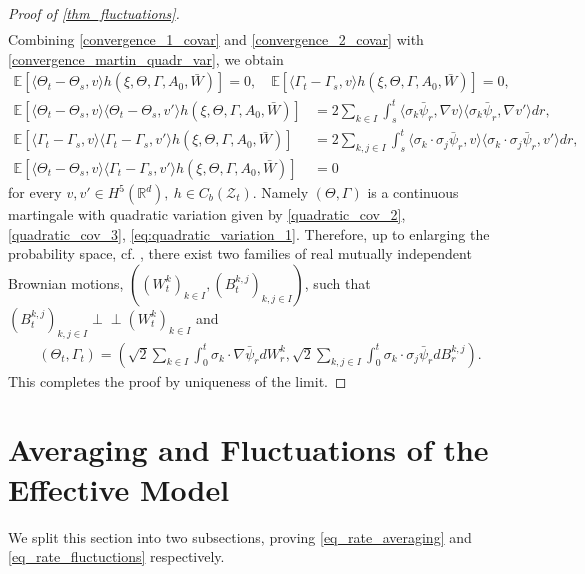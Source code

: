\documentclass[a4paper,10pt]{amsart}
\newcommand{\R}{\mathbb{R}}
\theoremstyle{remark}
\numberwithin{equation}{section}
\begin{document}
\begin{proof}[Proof of \cref{thm_fluctuations}]
\begin{multline}
\end{multline}
Combining \eqref{convergence_1_covar} and \eqref{convergence_2_covar} with \eqref{convergence_martin_quadr_var}, we obtain
\begin{align*}
\mathbb{E}\left[\langle \Theta_t-\Theta_s,v\rangle h(\xi,\Theta,\Gamma, A_0,\bar{W})\right]=0,\quad \mathbb{E}\left[\langle \Gamma_t-\Gamma_s,v\rangle h(\xi,\Theta,\Gamma, A_0,\bar{W})\right]=0,
    \end{align*}
    \begin{align}
    \label{quadratic_cov_2}
\mathbb{E}\left[\langle \Theta_t-\Theta_s,v\rangle\langle \Theta_t-\Theta_s,v'\rangle h(\xi,\Theta,\Gamma, A_0,\bar{W})\right]  &=2\sum_{k\in I}\int_s^t \langle \sigma_k\bar{\psi}_r,\nabla v\rangle \langle \sigma_k\bar{\psi}_{r},\nabla v'\rangle dr,\\ \label{quadratic_cov_3}
\mathbb{E}\left[\langle \Gamma_t-\Gamma_s,v\rangle\langle \Gamma_t-\Gamma_s,v'\rangle h(\xi,\Theta,\Gamma, A_0,\bar{W})\right]  &=2\sum_{k,j\in I}\int_s^t \langle \sigma_k\cdot\sigma_j\bar{\psi}_r, v\rangle \langle \sigma_k\cdot\sigma_j\bar{\psi}_{r}, v'\rangle dr,\\ \mathbb{E}\left[\langle \Theta_t-\Theta_s,v\rangle\langle \Gamma_t-\Gamma_s,v'\rangle h(\xi,\Theta,\Gamma, A_0,\bar{W})\right]  &=0
\label{eq:quadratic_variation_1}
    \end{align}
for every 
  $v,v'\in H^5(\R^d),\  h\in C_b(\mathcal{Z}_t)$. Namely $(\Theta,\Gamma)$ is a continuous martingale with quadratic variation given by \eqref{quadratic_cov_2}, \eqref{quadratic_cov_3}, \eqref{eq:quadratic_variation_1}.
Therefore, up to enlarging the probability space, cf. \cite[Theorem 8.2]{da2014stochastic}, there exist two families of real mutually independent Brownian motions, $((W^k_t)_{k\in  I},(B^{k,j}_t)_{k,j\in I})$, such that $(B^{k,j}_t)_{k,j\in I}\mathrel{\perp\!\!\!\perp} (W^{k}_t)_{k\in I}$ and 
\begin{align*}
   ( \Theta_t,\Gamma_t)= \left(\sqrt{2}\sum_{k\in I}\int_0^t \sigma_k\cdot\nabla\bar{\psi}_r dW^k_r,\sqrt{2}\sum_{k,j\in I}\int_0^t \sigma_k\cdot\sigma_j\bar{\psi}_r dB^{k,j}_r\right). 
\end{align*}
This completes the proof by uniqueness of the limit.
\end{proof}
  
\section{Averaging and Fluctuations of the Effective Model}\label{sec:proof_effective}
We split this section into two subsections, proving \eqref{eq_rate_averaging} and \eqref{eq_rate_fluctuctions} respectively.
\end{document}
